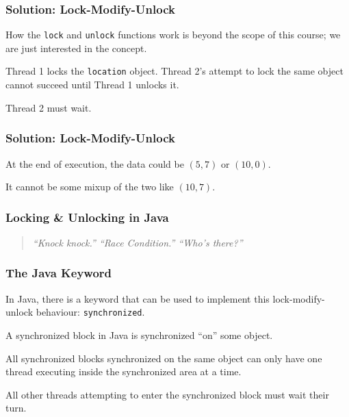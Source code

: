 \begin{frame}
\frametitle{Solution: Lock-Modify-Unlock}
\begin{changemargin}{1cm}

How the \texttt{lock} and \texttt{unlock} functions work is beyond the scope of this course; we are just interested in the concept.

Thread 1 locks the \texttt{location} object. Thread 2's attempt to lock the same object cannot succeed until Thread 1 unlocks it.

Thread 2 must wait.

\end{changemargin}
\end{frame}

\begin{frame}
\frametitle{Solution: Lock-Modify-Unlock}
\begin{changemargin}{1cm}

At the end of execution, the data could be $(5,7)$ or $(10,0)$.

It cannot be some mixup of the two like $(10, 7)$. 

\end{changemargin}
\end{frame}


\begin{frame}
\frametitle{Locking \& Unlocking in Java}
\begin{changemargin}{1cm}

\begin{quote}
\textit{``Knock knock.'' ``Race Condition.'' ``Who's there?''}
\end{quote}

\end{changemargin}
\end{frame}

\begin{frame}
\frametitle{The Java Keyword}
\begin{changemargin}{1cm}

In Java, there is a keyword that can be used to implement this lock-modify-unlock behaviour: \texttt{synchronized}.

A synchronized block in Java is synchronized ``on'' some object. 

All synchronized blocks synchronized on the same object can only have one thread executing inside the synchronized area at a time.

All other threads attempting to enter the synchronized block must wait their turn.

\end{changemargin}
\end{frame}


